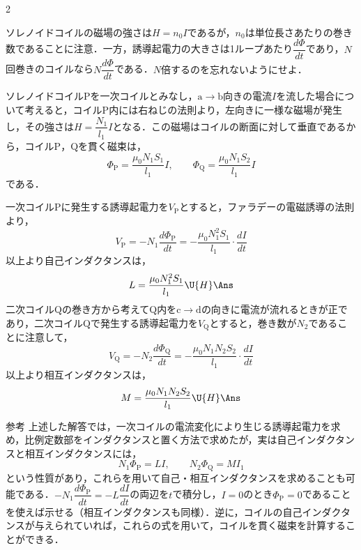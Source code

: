 \begin{multicols}{2}
\begin{sisin}
ソレノイドコイルの磁場の強さは$H=n_0I$であるが，$n_0$は{\gtfamily 単位長さあたりの}巻き数であることに注意．一方，誘導起電力の大きさは1ループあたり$\dfrac{d\varPhi}{dt}$であり，$N$回巻きのコイルなら$N\dfrac{d\varPhi}{dt}$である．{\gtfamily $N$倍するのを忘れないようにせよ．}
\end{sisin}
\KaiHead
ソレノイドコイル$\mathrm{P}$を一次コイルとみなし，$\mathrm{a}\to\mathrm{b}$向きの電流$I$を流した場合について考えると，コイル$\mathrm{P}$内には右ねじの法則より，左向きに一様な磁場が発生し，その強さは$H=\dfrac{N_1}{l_1}I$となる．この磁場はコイルの断面に対して垂直であるから，コイル$\mathrm{P}$，$\mathrm{Q}$を貫く磁束は，
\[\varPhi_{\mathrm{P}}=\frac{\mu_0N_1S_1}{l_1}I,\qquad\varPhi_{\mathrm{Q}}=\frac{\mu_0N_1S_2}{l_1}I\]
である．
\begin{komon}
 一次コイル$\mathrm{P}$に発生する誘導起電力を$V_{\mathrm{P}}$とすると，ファラデーの電磁誘導の法則より，
       \[V_{\mathrm{P}}=-N_1\frac{d\varPhi_{\mathrm{P}}}{dt}=-\frac{\mu_0N_1^2S_1}{l_1}\cdot\frac{dI}{dt}\]
       以上より自己インダクタンスは，
       \[L=\frac{\mu_0N_1^2S_1}{l_1}\U{H}\Ans\]
 二次コイル$\mathrm{Q}$の巻き方から考えて$\mathrm{Q}$内を$\mathrm{c}\to\mathrm{d}$の向きに電流が流れるときが正であり，二次コイル$\mathrm{Q}$で発生する誘導起電力を$V_{\mathrm{Q}}$とすると，巻き数が$N_2$であることに注意して，
       \[V_{\mathrm{Q}}=-N_2\frac{d\varPhi_{\mathrm{Q}}}{dt}=-\frac{\mu_0N_1N_2S_2}{l_1}\cdot\frac{dI}{dt}\]
       以上より相互インダクタンスは，
       \[M=\frac{\mu_0N_1N_2S_2}{l_1}\U{H}\Ans\]
\end{komon}
\begin{bsHosoku}{参考}
上述した解答では，一次コイルの電流変化により生じる誘導起電力を求め，比例定数部をインダクタンスと置く方法で求めたが，実は自己インダクタンスと相互インダクタンスには，
\[N_1\varPhi_{\mathrm{P}}=LI,\qquad N_2\varPhi_{\mathrm{Q}}=MI_1\]
という性質があり，これらを用いて自己・相互インダクタンスを求めることも可能である．$-N_1\dfrac{d\varPhi_{\mathrm{P}}}{dt}=-L\dfrac{dI}{dt}$の両辺を$t$で積分し，$I=0$のとき$\varPhi_{\mathrm{P}}=0$であることを使えば示せる（相互インダクタンスも同様）．逆に，コイルの自己インダクタンスが与えられていれば，これらの式を用いて，コイルを貫く磁束を計算することができる．
\end{bsHosoku}


\end{multicols}
